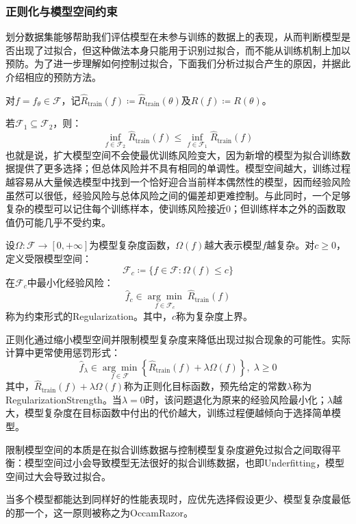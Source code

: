 \subsubsection{正则化与模型空间约束}
划分数据集能够帮助我们评估模型在未参与训练的数据上的表现，从而判断模型是否出现了过拟合，但这种做法本身只能用于识别过拟合，而不能从训练机制上加以预防。为了进一步理解如何控制过拟合，下面我们分析过拟合产生的原因，并据此介绍相应的预防方法。\par
对$f=f_\theta\in\mathcal{F}$，记$\hat{R}_{\mathrm{train}}(f)\coloneq\hat{R}_{\mathrm{train}}(\theta)$及$R(f)\coloneq R(\theta)$。\par
若$\mathcal{F}_1\subseteq\mathcal{F}_2$，则：
\begin{equation*}
	\inf_{f\in\mathcal{F}_2}\hat{R}_{\mathrm{train}}(f)\leqslant\inf_{f\in\mathcal{F}_1}\hat{R}_{\mathrm{train}}(f)
\end{equation*}
也就是说，扩大模型空间不会使最优训练风险变大，因为新增的模型为拟合训练数据提供了更多选择；但总体风险并不具有相同的单调性。模型空间越大，训练过程越容易从大量候选模型中找到一个恰好迎合当前样本偶然性的模型，因而经验风险虽然可以很低，经验风险与总体风险之间的偏差却更难控制。与此同时，一个足够复杂的模型可以记住每个训练样本，使训练风险接近$0$；但训练样本之外的函数取值仍可能几乎不受约束。
\begin{definition}
	设$\Omega:\mathcal{F}\to[0,+\infty]$为模型复杂度函数，$\Omega(f)$越大表示模型$f$越复杂。对$c\geqslant0$，定义受限模型空间：
	\begin{equation*}
		\mathcal{F}_c\coloneq\{f\in\mathcal{F}:\Omega(f)\leqslant c\}
	\end{equation*}
	在$\mathcal{F}_c$中最小化经验风险：
	\begin{equation*}
		\hat{f}_c\in\underset{f\in\mathcal{F}_c}{\arg\min}\;\hat{R}_{\mathrm{train}}(f)
	\end{equation*}
	称为约束形式的\gls{Regularization}。其中，$c$称为复杂度上界。
\end{definition}
正则化通过缩小模型空间并限制模型复杂度来降低出现过拟合现象的可能性。实际计算中更常使用惩罚形式：
\begin{equation*}
	\hat{f}_\lambda\in\underset{f\in\mathcal{F}}{\arg\min}\left\{\hat{R}_{\mathrm{train}}(f)+\lambda\Omega(f)\right\},\;\lambda\geqslant0
\end{equation*}
其中，$\hat{R}_{\mathrm{train}}(f)+\lambda\Omega(f)$称为正则化目标函数，预先给定的常数$\lambda$称为\gls{RegularizationStrength}。当$\lambda=0$时，该问题退化为原来的经验风险最小化；$\lambda$越大，模型复杂度在目标函数中付出的代价越大，训练过程便越倾向于选择简单模型。
\begin{note}
	限制模型空间的本质是在拟合训练数据与控制模型复杂度避免过拟合之间取得平衡：模型空间过小会导致模型无法很好的拟合训练数据，也即\gls{Underfitting}，模型空间过大会导致过拟合。\par
	当多个模型都能达到同样好的性能表现时，应优先选择假设更少、模型复杂度最低的那一个，这一原则被称之为\gls{OccamRazor}。
\end{note}
